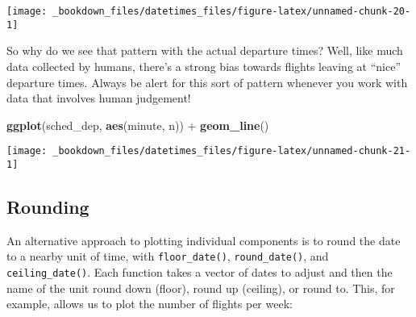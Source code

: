 \documentclass[]{book}
\newenvironment{Shaded}{\begin{snugshade}}{\end{snugshade}}
\newcommand{\KeywordTok}[1]{\textcolor[rgb]{0.13,0.29,0.53}{\textbf{{#1}}}}
\newcommand{\DataTypeTok}[1]{\textcolor[rgb]{0.13,0.29,0.53}{{#1}}}
\newcommand{\StringTok}[1]{\textcolor[rgb]{0.31,0.60,0.02}{{#1}}}
\newcommand{\OtherTok}[1]{\textcolor[rgb]{0.56,0.35,0.01}{{#1}}}
\newcommand{\NormalTok}[1]{{#1}}
\begin{document}
\begin{Shaded}
\end{Shaded}

\begin{center}\texttt{[image: \_bookdown\_files/datetimes\_files/figure-latex/unnamed-chunk-20-1]} \end{center}

So why do we see that pattern with the actual departure times? Well,
like much data collected by humans, there's a strong bias towards
flights leaving at ``nice'' departure times. Always be alert for this
sort of pattern whenever you work with data that involves human
judgement!

\begin{Shaded}
\begin{Highlighting}[]
\KeywordTok{ggplot}\NormalTok{(sched_dep, }\KeywordTok{aes}\NormalTok{(minute, n)) +}
\StringTok{  }\KeywordTok{geom_line}\NormalTok{()}
\end{Highlighting}
\end{Shaded}

\begin{center}\texttt{[image: \_bookdown\_files/datetimes\_files/figure-latex/unnamed-chunk-21-1]} \end{center}

\subsection{Rounding}\label{rounding}

An alternative approach to plotting individual components is to round
the date to a nearby unit of time, with \texttt{floor\_date()},
\texttt{round\_date()}, and \texttt{ceiling\_date()}. Each function
takes a vector of dates to adjust and then the name of the unit round
down (floor), round up (ceiling), or round to. This, for example, allows
us to plot the number of flights per week:
\end{document}
